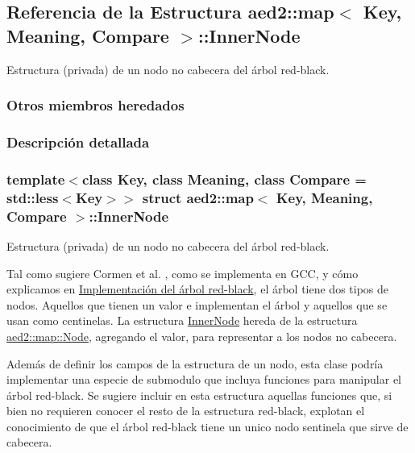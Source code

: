 \hypertarget{structaed2_1_1map_1_1InnerNode}{}\subsection{Referencia de la Estructura aed2\+:\+:map$<$ Key, Meaning, Compare $>$\+:\+:Inner\+Node}
\label{structaed2_1_1map_1_1InnerNode}


Estructura (privada) de un nodo no cabecera del árbol red-\/black.  


\subsubsection*{Otros miembros heredados}


\subsubsection{Descripción detallada}
\subsubsection*{template$<$class Key, class Meaning, class Compare = std\+::less$<$\+Key$>$$>$\newline
struct aed2\+::map$<$ Key, Meaning, Compare $>$\+::\+Inner\+Node}

Estructura (privada) de un nodo no cabecera del árbol red-\/black. 

Tal como sugiere Cormen et al. \cite{CormenLeisersonRivestStein2009}, como se implementa en G\+CC, y cómo explicamos en \hyperlink{Implementacion}{Implementación del árbol red-\/black}, el árbol tiene dos tipos de nodos. Aquellos que tienen un valor e implementan el árbol y aquellos que se usan como centinelas. La estructura \hyperlink{structaed2_1_1map_1_1InnerNode}{Inner\+Node} hereda de la estructura \hyperlink{structaed2_1_1map_1_1Node}{aed2\+::map\+::\+Node}, agregando el valor, para representar a los nodos no cabecera.

Además de definir los campos de la estructura de un nodo, esta clase podría implementar una especie de submodulo que incluya funciones para manipular el árbol red-\/black. Se sugiere incluir en esta estructura aquellas funciones que, si bien no requieren conocer el resto de la estructura red-\/black, explotan el conocimiento de que el árbol red-\/black tiene un unico nodo sentinela que sirve de cabecera.


